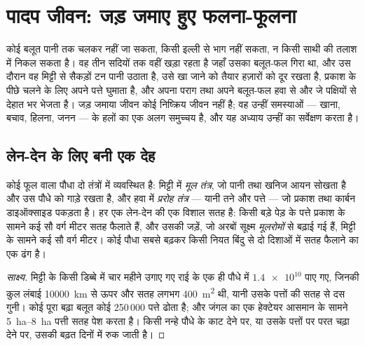 \chapter{पादप जीवन: जड़ जमाए हुए फलना-फूलना}\label{ch:g12:plant-rooted-life}

कोई बलूत पानी तक चलकर नहीं जा सकता, किसी इल्ली से भाग नहीं सकता, न किसी
साथी की तलाश में निकल सकता है। वह तीन सदियों तक वहीं खड़ा रहता है जहाँ उसका
बलूत-फल गिरा था, और उस दौरान वह मिट्टी से सैकड़ों टन पानी उठाता है, उसे खा
जाने को तैयार हज़ारों  को दूर रखता है, प्रकाश के पीछे चलने के लिए
अपने पत्ते घुमाता है, और अपना पराग तथा अपने बलूत-फल हवा से और जे पक्षियों से
देहात भर भेजता है। जड़ जमाया जीवन कोई निष्क्रिय जीवन नहीं है; वह उन्हीं
समस्याओं --- खाना, बचाव, हिलना, जनन --- के हलों का एक अलग समुच्चय है, और यह
अध्याय उन्हीं का सर्वेक्षण करता है।

\section{लेन-देन के लिए बनी एक देह}

\begin{proposition}[दो तंत्र, दो सतहें]\label{prop:g12:plant-rooted-life:surfaces}
कोई फूल वाला पौधा दो तंत्रों में व्यवस्थित है: मिट्टी में \emph{मूल तंत्र},
जो पानी तथा खनिज आयन सोखता है और उस पौधे को गाड़े रखता है, और हवा में
\emph{प्ररोह तंत्र} --- यानी तने और पत्ते --- जो प्रकाश तथा कार्बन
डाइऑक्साइड पकड़ता है। हर एक लेन-देन की एक विशाल सतह है: किसी बड़े पेड़ के
पत्ते प्रकाश के सामने कई सौ वर्ग मीटर सतह फैलाते हैं, और उसकी जड़ें, जो
अरबों सूक्ष्म \emph{मूलरोमों} से बढ़ाई गई हैं, मिट्टी के सामने
कई सौ वर्ग मीटर। कोई पौधा सबसे बढ़कर किसी नियत बिंदु से दो दिशाओं में सतह
फैलाने का एक ढंग है।
\end{proposition}
\begin{proof}[साक्ष्य]
मिट्टी के किसी डिब्बे में चार महीने उगाए गए राई के एक ही पौधे में
$\num{1.4e10}$  पाए गए, जिनकी कुल लंबाई \qty{10000}{km} से ऊपर और
सतह लगभग \qty{400}{m^2} थी, यानी उसके पत्तों की सतह से दस गुनी। कोई पूरा
बढ़ा बलूत कोई 250\,000 पत्ते ढोता है; और जंगल का एक हेक्टेयर आसमान के
सामने \qtyrange{5}{8}{ha} पत्ती सतह पेश करता है। किसी नन्हे पौधे के 
काट देने पर, या उसके पत्तों पर परत चढ़ा देने पर, उसकी बढ़त दिनों में रुक
जाती है।
\end{proof}

